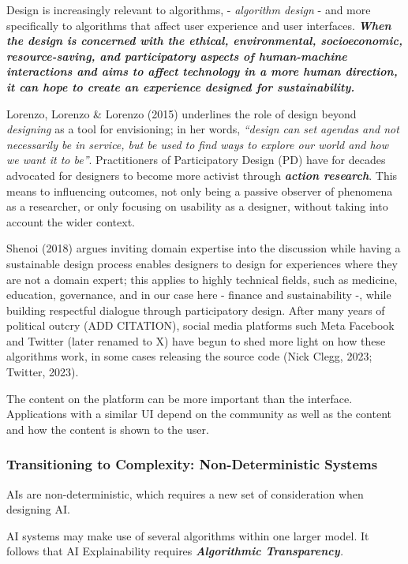 \documentclass[
  letterpaper,
  DIV=11,
  numbers=noendperiod]{scrartcl}
\begin{document}
Design is increasingly relevant to algorithms, - \emph{algorithm design}
- and more specifically to algorithms that affect user experience and
user interfaces. \textbf{\emph{When the design is concerned with the
ethical, environmental, socioeconomic, resource-saving, and
participatory aspects of human-machine interactions and aims to affect
technology in a more human direction, it can hope to create an
experience designed for sustainability.}}

Lorenzo, Lorenzo \& Lorenzo (2015) underlines the role of design beyond
\emph{designing} as a tool for envisioning; in her words, \emph{``design
can set agendas and not necessarily be in service, but be used to find
ways to explore our world and how we want it to be''}. Practitioners of
Participatory Design (PD) have for decades advocated for designers to
become more activist through \textbf{\emph{action research}}. This means
to influencing outcomes, not only being a passive observer of phenomena
as a researcher, or only focusing on usability as a designer, without
taking into account the wider context.

Shenoi (2018) argues inviting domain expertise into the discussion while
having a sustainable design process enables designers to design for
experiences where they are not a domain expert; this applies to highly
technical fields, such as medicine, education, governance, and in our
case here - finance and sustainability -, while building respectful
dialogue through participatory design. After many years of political
outcry (ADD CITATION), social media platforms such Meta Facebook and
Twitter (later renamed to X) have begun to shed more light on how these
algorithms work, in some cases releasing the source code (Nick Clegg,
2023; Twitter, 2023).

The content on the platform can be more important than the interface.
Applications with a similar UI depend on the community as well as the
content and how the content is shown to the user.

\subsubsection{Transitioning to Complexity: Non-Deterministic
Systems}\label{transitioning-to-complexity-non-deterministic-systems}

AIs are non-deterministic, which requires a new set of consideration
when designing AI.

AI systems may make use of several algorithms within one larger model.
It follows that AI Explainability requires \emph{\textbf{Algorithmic
Transparency}.}
\end{document}
